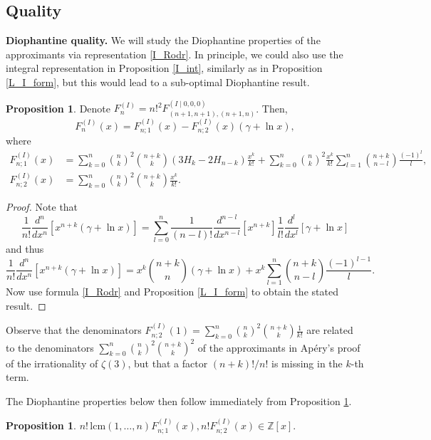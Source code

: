 \documentclass[a4paper,12pt,oneside]{article}
\theoremstyle{definition}
\newtheorem{prop}[defi]{Proposition}
\newcommand{\Z}{\mathbb{Z}}
\begin{document}
\subsection{Quality} \label{EC_proof}

\textbf{Diophantine quality.} We will study the Diophantine properties of the approximants via representation \eqref{I_Rodr}. In principle, we could also use the integral representation in Proposition \ref{I_int}, similarly as in Proposition \ref{L_I_form}, but this would lead to a sub-optimal Diophantine result.


\begin{prop} \label{I_form}
Denote $F_{n}^{(I)} = n!^2 F_{(n+1,n+1),(n+1,n)}^{(I\mid 0,0,0)} $. Then,
    $$F_{n}^{(I)}(x) = F_{n;1}^{(I)}(x) - F_{n;2}^{(I)}(x) (\gamma + \ln x),$$
where
$$\begin{aligned}
    F_{n;1}^{(I)}(x) &= \sum_{k=0}^{n} \binom{n}{k}^2 \binom{n+k}{k} \left( 3H_k - 2 H_{n-k} \right) \frac{x^k}{k!} 
    + \sum_{k=0}^{n} \binom{n}{k}^2 \frac{x^k}{k!} \sum_{l=1}^{n} \binom{n+k}{n-l} \frac{(-1)^l}{l}, \\
    F_{n;2}^{(I)}(x) &= \sum_{k=0}^{n} \binom{n}{k}^2 \binom{n+k}{k} \frac{x^k}{k!}.
\end{aligned}$$
\end{prop}
\begin{proof}
Note that
    $$ \frac{1}{n!} \frac{d^n}{dx^n}[x^{n+k} (\gamma+\ln x)] = \sum_{l=0}^n \frac{1}{(n-l)!} \frac{d^{n-l}}{dx^{n-l}}[x^{n+k}] \frac{1}{l!} \frac{d^l}{dx^l}[\gamma+\ln x] $$
and thus 
$$ \frac{1}{n!} \frac{d^n}{dx^n}[x^{n+k} (\gamma+\ln x)] = x^k \binom{n+k}{n} (\gamma+\ln x) + x^k \sum_{l=1}^n \binom{n+k}{n-l} \frac{(-1)^{l-1}}{l}. $$
Now use formula \eqref{I_Rodr} and Proposition \ref{L_I_form} to obtain the stated result.
\end{proof}



Observe that the denominators $F_{n;2}^{(I)}(1) = \sum_{k=0}^{n} \binom{n}{k}^2 \binom{n+k}{k} \frac{1}{k!}$ are related to the denominators $\sum_{k=0}^{n} \binom{n}{k}^2 \binom{n+k}{k}^2$ of the approximants in Apéry's proof \cite{Apery} of the irrationality of $\zeta(3)$, but that a factor $(n+k)!/n!$ is missing in the $k$-th term.
\medbreak

The Diophantine properties below then follow immediately from Proposition \ref{I_form}. 

\begin{prop} \label{I_DQ}
    $ n! \, \text{lcm}(1,\dots,n) F_{n;1}^{(I)}(x), n! F_{n;2}^{(I)}(x) \in\Z[x]. $
\end{prop}
\bigbreak
\end{document}
